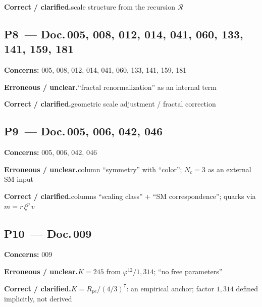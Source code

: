 \smallskip\noindent\textbf{Correct / clarified.}\quad scale structure from the recursion $\mathcal{R}$


\medskip


\subsection*{P8~--- Doc.\,005, 008, 012, 014, 041, 060, 133, 141, 159, 181}

\noindent\textbf{Concerns:} 005, 008, 012, 014, 041, 060, 133, 141, 159, 181


\smallskip\noindent\textbf{Erroneous / unclear.}\quad \enquote{fractal renormalization} as an internal term


\smallskip\noindent\textbf{Correct / clarified.}\quad geometric scale adjustment / fractal correction


\medskip


\subsection*{P9~--- Doc.\,005, 006, 042, 046}

\noindent\textbf{Concerns:} 005, 006, 042, 046


\smallskip\noindent\textbf{Erroneous / unclear.}\quad column \enquote{symmetry} with \enquote{color}; \newline
  $N_c = 3$ as an external SM input


\smallskip\noindent\textbf{Correct / clarified.}\quad columns \enquote{scaling class} + \enquote{SM correspondence}; \newline
  quarks via $m = r\,\xi^p\,v$


\medskip


\subsection*{P10~--- Doc.\,009}

\noindent\textbf{Concerns:} 009


\smallskip\noindent\textbf{Erroneous / unclear.}\quad $K = 245$ from $\varphi^{12}/1{,}314$; \newline
  \enquote{no free parameters}


\smallskip\noindent\textbf{Correct / clarified.}\quad $K = R_{pe}/(4/3)^7$: an empirical anchor; \newline
  factor $1{,}314$ defined implicitly, not derived


